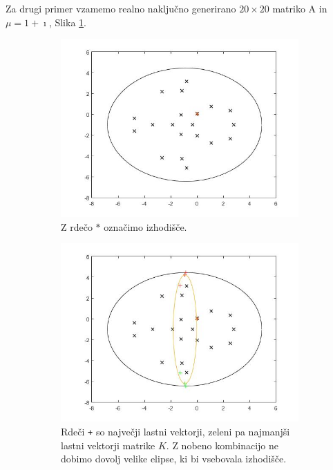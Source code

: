 \documentclass[12pt,a4paper]{amsart}
\theoremstyle{definition}
\theoremstyle{plain}
\begin{document}
Za drugi primer vzamemo realno naključno generirano $20\times 20$ matriko A in $\mu = 1 + \imath$, Slika \ref{fig:p41}.
\begin{figure}[H]
\begin{subfigure}[t]{0.5\textwidth}
\includegraphics[width=0.9\linewidth]{RC2.jpg}
\caption{Z rdečo $\ast$ označimo izhodišče.}
\label{fig:p41}
\end{subfigure}%
\hfill
\begin{subfigure}[t]{0.5\textwidth}
\includegraphics[width=0.9\linewidth]{RC2e1.jpg}
\caption{Rdeči \verb~+~ so največji lastni vektorji, zeleni pa najmanjši lastni vektorji matrike $K$\footnotemark. Z nobeno kombinacijo ne dobimo dovolj velike elipse, ki bi vsebovala izhodišče.}
\label{fig:p42}
\end{subfigure}
\hfill
\begin{subfigure}[t]{0.5\textwidth}

\end{subfigure}
\end{figure}
\end{document}

